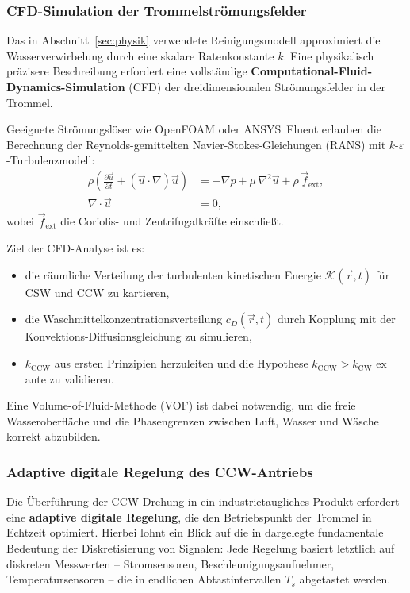 ﻿\documentclass[12pt,a4paper]{article}
\theoremstyle{remark}
\newcommand{\CCW}{\mathrm{CCW}}
\newcommand{\CW}{\mathrm{CW}}
\begin{document}
	\subsubsection{CFD-Simulation der Trommelströmungsfelder}
	
	Das in Abschnitt~\ref{sec:physik} verwendete Reinigungsmodell approximiert die
	Wasserverwirbelung durch eine skalare Ratenkonstante $k$. Eine physikalisch präzisere
	Beschreibung erfordert eine vollständige \textbf{Computational-Fluid-Dynamics-Simulation}
	(CFD) der dreidimensionalen Strömungsfelder in der Trommel.
	
	Geeignete Strömungslöser wie OpenFOAM oder ANSYS~Fluent erlauben die Berechnung der
	Reynolds-gemittelten Navier-Stokes-Gleichungen (RANS) mit $k$-$\varepsilon$-Turbulenz\-modell:
	\begin{align}
		\rho\left(\frac{\partial \vec{u}}{\partial t} + (\vec{u}\cdot\nabla)\vec{u}\right)
		&= -\nabla p + \mu\,\nabla^2\vec{u} + \rho\,\vec{f}_{\mathrm{ext}},\\
		\nabla\cdot\vec{u} &= 0,
	\end{align}
	wobei $\vec{f}_{\mathrm{ext}}$ die Coriolis- und Zentrifugalkräfte einschließt.
	
	Ziel der CFD-Analyse ist es:
	\begin{itemize}
		\item die räumliche Verteilung der turbulenten kinetischen Energie $\mathcal{K}(\vec{r},t)$
		für CSW und CCW zu kartieren,
		\item die Waschmittelkonzentrationsverteilung $c_D(\vec{r},t)$ durch Kopplung mit der
		Konvek\-tions-Diffusionsgleichung zu simulieren,
		\item $k_{\CCW}$ aus ersten Prinzipien herzuleiten und die Hypothese
		$k_{\CCW} > k_{\CW}$ ex ante zu validieren.
	\end{itemize}
	
	Eine Volume-of-Fluid-Methode (VOF) ist dabei notwendig, um die freie Wasseroberfläche
	und die Phasengrenzen zwischen Luft, Wasser und Wäsche korrekt abzubilden.
	
	\subsubsection{Adaptive digitale Regelung des CCW-Antriebs}
	
	Die Überführung der CCW-Drehung in ein industrietaugliches Produkt erfordert eine
	\textbf{adaptive digitale Regelung}, die den Betriebspunkt der Trommel in Echtzeit
	optimiert. Hierbei lohnt ein Blick auf die in \cite{epp2026digi} dargelegte
	fundamentale Bedeutung der Diskretisierung von Signalen: Jede Regelung basiert letztlich
	auf diskreten Messwerten -- Stromsensoren, Beschleunigungsaufnehmer,
	Temperatursensoren -- die in endlichen Abtastintervallen $T_s$ abgetastet werden.
	
\end{document}
